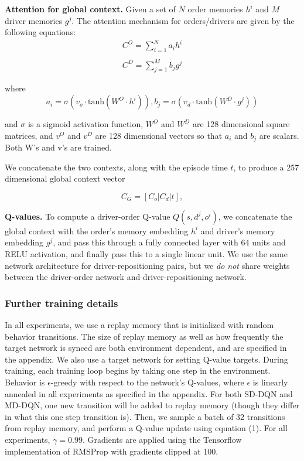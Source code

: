 {\bf Attention for global context.} Given a set of $N$ order memories $h^i$ and $M$ driver memories $g^j$. The attention mechanism for orders/drivers are given by the following equations:
\begin{align*}
C^O = \sum_{i=1}^{N} a_i h^i \\
\\
C^D = \sum_{j=1}^{M} b_j g^j
\end{align*}

\noindent where
\begin{equation}
a_i = \sigma(v_o \cdot \mathrm{tanh}(W^O \cdot h^i)), 
b_j = \sigma(v_d \cdot \mathrm{tanh}(W^D \cdot g^j))
\end{equation}

\noindent and $\sigma$ is a sigmoid activation function, $W^O$ and $W^D$ are 128 dimensional square matrices, and $v^O$ and $v^D$ are 128 dimensional vectors so that $a_i$ and $b_j$ are scalars. Both W's and v's are trained. \newline
% 

We concatenate the two contexts, along with the episode time $t$, to produce a 257 dimensional global context vector

\begin{equation}
C_G = [C_o | C_d | t],
\end{equation}

{\bf Q-values.} To compute a driver-order Q-value $Q(s, d^j, o^i)$, we concatenate the global context with the order's memory embedding $h^i$ and driver's memory embedding $g^j$, and pass this through a fully connected layer with 64 units and RELU activation, and finally pass this to a single linear unit. We use the same network architecture for driver-repositioning pairs, but we {\em do not} share weights between the driver-order network and driver-repositioning network.

\subsubsection{Further training details}

In all experiments, we use a replay memory that is initialized with random behavior transitions. The size of replay memory as well as how frequently the target network is synced are both environment dependent, and are specified in the appendix. We also use a target network for setting Q-value targets. During training, each training loop begins by taking one step in the environment. Behavior is $\epsilon$-greedy with respect to the network's Q-values, where $\epsilon$ is linearly annealed in all experiments as specified in the appendix. For both SD-DQN and MD-DQN, one new transition will be added to replay memory (though they differ in what this one step transition is). Then, we sample a batch of 32 transitions from replay memory, and perform a Q-value update using equation (1). For all experiments, $\gamma = 0.99$. Gradients are applied using the Tensorflow implementation of RMSProp with gradients clipped at 100.
